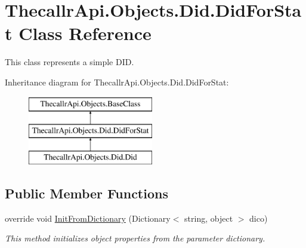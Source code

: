 \hypertarget{class_thecallr_api_1_1_objects_1_1_did_1_1_did_for_stat}{\section{Thecallr\+Api.\+Objects.\+Did.\+Did\+For\+Stat Class Reference}
\label{class_thecallr_api_1_1_objects_1_1_did_1_1_did_for_stat}
}


This class represents a simple D\+I\+D.  


Inheritance diagram for Thecallr\+Api.\+Objects.\+Did.\+Did\+For\+Stat\+:\begin{figure}[H]
\begin{center}
\leavevmode
\includegraphics[height=3.000000cm]{class_thecallr_api_1_1_objects_1_1_did_1_1_did_for_stat}
\end{center}
\end{figure}
\subsection*{Public Member Functions}
\begin{DoxyCompactItemize}
\item 
override void \hyperlink{class_thecallr_api_1_1_objects_1_1_did_1_1_did_for_stat_a586b03f0f32163303070c9f0d6ddb7aa}{Init\+From\+Dictionary} (Dictionary$<$ string, object $>$ dico)
\begin{DoxyCompactList}\small\item\em This method initializes object properties from the parameter dictionary. \end{DoxyCompactList}\end{DoxyCompactItemize}
